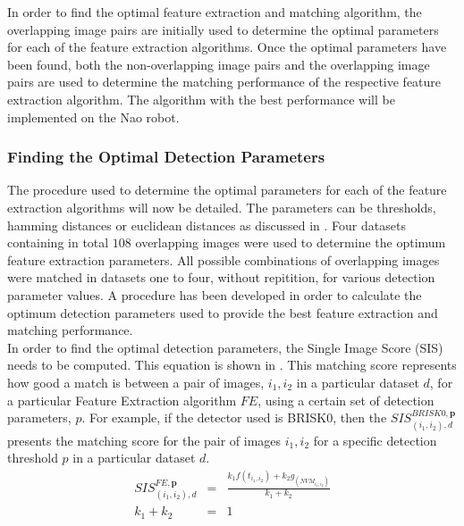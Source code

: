 \documentclass{article}
\begin{document}
In order to find the optimal feature extraction and matching algorithm, the overlapping image pairs are initially used to determine the optimal parameters for each of the feature extraction algorithms. Once the optimal parameters have been found, both the non-overlapping image pairs and the overlapping image pairs are used to determine the matching performance of the respective feature extraction algorithm. The algorithm with the best performance will be implemented on the Nao robot.\\

\subsubsection{Finding the Optimal Detection Parameters}
\label{sec:optimalParameters}
The procedure used to determine the optimal parameters for each of the feature extraction algorithms will now be detailed. The parameters can be thresholds, hamming distances or euclidean distances as discussed in . Four datasets containing in total $108$ overlapping images were used to determine the optimum feature extraction parameters. All possible combinations of overlapping images were matched in datasets  one to four, without repitition, for various detection parameter values. A procedure has been developed in order to calculate the optimum detection parameters used to provide the best feature extraction and matching performance.\\
In order to find the optimal detection parameters, the Single Image Score (SIS) needs to be computed. This equation is shown in . This matching score represents how good a match is between a pair of images, $i_1, i_2$ in a particular dataset $d$, for a particular Feature Extraction algorithm $FE$, using a certain set of detection parameters, $p$. For example, if the detector used is BRISK0, then the $SIS_{(i_1, i_2), d}^{BRISK0, \textbf{p}}$ presents the matching score for the pair of images $i_1, i_2$ for a specific detection threshold $p$ in a particular dataset $d$. \\

\begin{eqnarray}
SIS_{(i_1, i_2), d}^{FE, \textbf{p}} &=& \frac{k_1 f(t_{i_1,i_2}) + k_2 g_(\textit{NVM}_{i_1,i_2})}{k_1 + k_2} \\
k_1 + k_2 &=& 1  
\label{eqn:optimalParameters}
\end{eqnarray}
\end{document}
